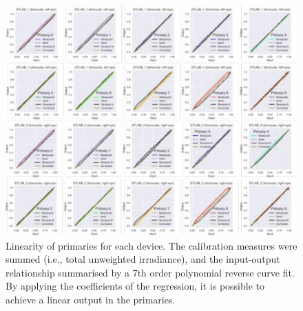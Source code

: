\documentclass[
]{article}
\begin{document}
\begin{figure}

{\centering \includegraphics{Figures/SuppFig1} 

}

\caption{Linearity of primaries for each device. The calibration measures were summed (i.e., total unweighted irradiance), and the input-output relationship summarised by a 7th order polynomial reverse curve fit. By applying the coefficients of the regression, it is possible to achieve a linear output in the primaries.}\label{fig:primarylinearity}
\end{figure}
\end{document}

